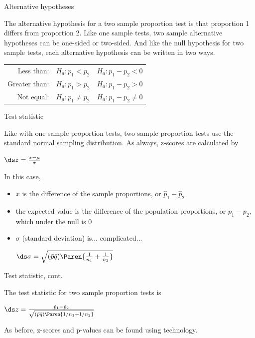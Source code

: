\documentclass[xcolor=table, handout]{beamer}
\begin{document}
\begin{frame}{Alternative hypotheses}
\begin{block}{}
\large
The alternative hypothesis for a two sample proportion test is that proportion 1 differs from proportion 2. Like one sample tests, two sample alternative hypotheses can be one-sided or two-sided. And like the null hypothesis for two sample tests, each alternative hypothesis can be written in two ways.\\
\smallskip
{\centering 
\begin{tabular}{r c | c}
Less than: & $H_a: p_1 < p_2$ & $H_a: p_1 - p_2 < 0$\\
Greater than: & $H_a: p_1 > p_2$ & $H_a: p_1 - p_2 > 0$\\
Not equal: & $H_a: p_1 \ne p_2$ & $H_a: p_1 - p_2 \ne 0$
\end{tabular}
\par}

\end{block}
\end{frame}

\begin{frame}{Test statistic}
\begin{block}{}
\large
Like with one sample proportion tests, two sample proportion tests use the standard normal sampling distribution. As always, z-scores are calculated by\\
\medskip
{\centering $\ds z = \frac{x - \mu}{\sigma}$ \par}
\pause\medskip
In this case, 
\begin{itemize}
\pause\item $x$ is the difference of the sample proportions, or $\hat p_1 - \hat p_2$
\pause\item the expected value is the difference of the population proportions, or $p_1 - p_2$, which under the null is 0
\pause\item $\sigma$ (standard deviation) is... complicated...\\
\medskip
{\centering $\ds \sigma = \sqrt{(\bar p \bar q)\Paren{\frac {1}{n_1} + \frac {1}{n_2}}}$
\par}
\medskip
\end{itemize}
\end{block}
\end{frame}

\begin{frame}{Test statistic, cont.}
\begin{block}{}
\large
The test statistic for two sample proportion tests is\\
\medskip
{\centering $\ds z = \frac{\hat p_1 - \hat p_2}{\sqrt{(\bar p \bar q)\Paren{1/n_1 + 1/n_2}}}$ \par}
\medskip
As before, z-scores and p-values can be found using technology.
\end{block}
\end{frame}
\end{document}
